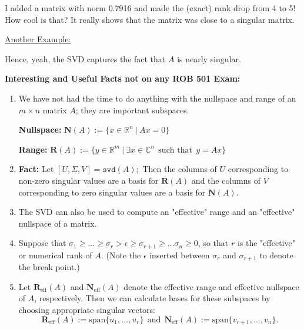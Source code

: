 \documentclass[letterpaper]{article}
\newcommand{\real}{\mathbb R}  %
\newcommand{\cp}{\mathbb C}    %
\newcommand{\spanof}[1]{\textrm{span} \{ #1 \}}
\begin{document}
\vspace*{1cm}
I added a matrix with norm 0.7916 and made the (exact)  rank drop from 4 to 5! How cool is that? It really shows that the matrix was close to a singular matrix.

\underline{Another Example:}



Hence, yeah, the SVD captures the fact that $A$ is nearly singular.
\newpage

\textbf{Interesting and Useful Facts not on any ROB 501 Exam:}
\begin{enumerate}
\setlength{\itemsep}{.1in}
\renewcommand{\labelenumi}{(\alph{enumi})}
\item We have not had the time to do anything with the nullspace and range of an $m\times n$  matrix $A$; they are important subspaces.
    \vspace*{1cm}

\textbf{Nullspace:} $\mathbf{N}(A):=\{ x\in \real^n~|~ Ax = 0\}$

 \vspace*{1cm}

\textbf{Range:} $\mathbf{R}(A):=\{ y\in \real^m~|~ \exists x\in \cp^n~~\text{such that}~~ y = Ax \}$

 \vspace*{1cm}

 \item \textbf{Fact:} Let $[U,\Sigma,V]=\texttt{svd}(A);$ Then the columns of $U$ corresponding to non-zero singular values are a basis for $\mathbf{R}(A)$ and the columns of $V$ corresponding to zero singular values are a basis for $\mathbf{N}(A)$.

\item The SVD can also be used to compute an "effective" range and an "effective" nullspace of a matrix.

\item Suppose that $\sigma_1 \geq ... \geq \sigma_r > \epsilon \ge  \sigma_{r+1} \geq ... \sigma_n \geq 0$, so that $r$ is the "effective" or numerical rank of $A$. (Note the $\epsilon$ inserted between $\sigma_r$ and $\sigma_{r+1}$ to denote the break point.)

\item Let $\mathbf{R}_{\text{eff}}(A)$ and $\mathbf{N}_\text{{eff}}(A)$ denote the effective range and effective nullspace of $A$, respectively. Then we can calculate bases for these subspaces by choosing appropriate singular vectors:
$$\mathbf{R}_{\text{eff}}(A) := \spanof{u_1, ..., u_r} ~~ \text{and} ~~ \mathbf{N}_{\text{eff}}(A) := \spanof{v_{r+1}, ..., v_n}.$$
\end{enumerate}
\end{document}
